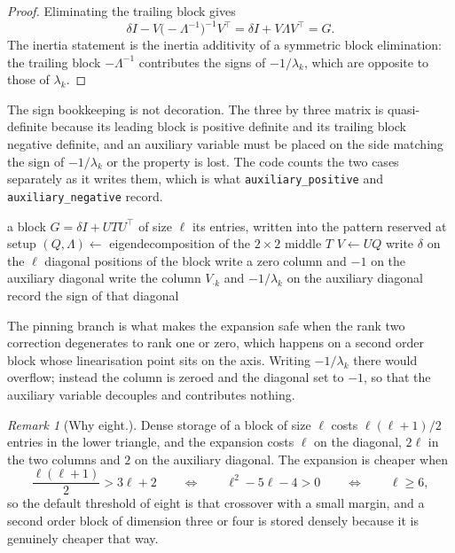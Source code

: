 \documentclass[a4paper,11pt]{book}
\theoremstyle{plain}
\theoremstyle{definition}
\theoremstyle{remark}
\newtheorem{remark}[theorem]{Remark}
\numberwithin{equation}{chapter}
\numberwithin{algorithm}{chapter}
\begin{document}
	\begin{proof}
		Eliminating the trailing block gives
		\[
		\delta I-V\bigl(-\Lambda^{-1}\bigr)^{-1}V^{\top}
		=\delta I+V\Lambda V^{\top}=G .
		\]
		The inertia statement is the inertia additivity of a symmetric block
		elimination: the trailing block $-\Lambda^{-1}$ contributes the signs of
		$-1/\lambda_k$, which are opposite to those of $\lambda_k$.
	\end{proof}

	The sign bookkeeping is not decoration. The three by three matrix is
	quasi-definite because its leading block is positive definite and its trailing
	block negative definite, and an auxiliary variable must be placed on the side
	matching the sign of $-1/\lambda_k$ or the property is lost. The code counts
	the two cases separately as it writes them, which is what
	\texttt{auxiliary\_positive} and \texttt{auxiliary\_negative} record.

	\begin{algorithm}[H]
		\caption{\texttt{write\_expanded}, one block}
		\begin{algorithmic}[1]
			\Require a block $G=\delta I+UTU^{\top}$ of size $\ell$
			\Ensure its entries, written into the pattern reserved at setup
			\State $(Q,\Lambda)\gets$ eigendecomposition of the $2\times2$ middle
			$T$
			\State $V\gets UQ$
			\State write $\delta$ on the $\ell$ diagonal positions of the block
			\State write a zero column and $-1$ on the auxiliary diagonal
			\Else
			\State write the column $V_{\cdot k}$ and $-1/\lambda_k$ on the
			auxiliary diagonal
			\EndIf
			\State record the sign of that diagonal
			\EndFor
		\end{algorithmic}
	\end{algorithm}

	The pinning branch is what makes the expansion safe when the rank two
	correction degenerates to rank one or zero, which happens on a second order
	block whose linearisation point sits on the axis. Writing $-1/\lambda_k$ there
	would overflow; instead the column is zeroed and the diagonal set to $-1$, so
	that the auxiliary variable decouples and contributes nothing.

	\begin{remark}[Why eight.]
	Dense storage of a block of size $\ell$ costs $\ell(\ell+1)/2$ entries in the
	lower triangle, and the expansion costs $\ell$ on the diagonal, $2\ell$ in the
	two columns and $2$ on the auxiliary diagonal. The expansion is cheaper when
	\[
	\frac{\ell(\ell+1)}{2}>3\ell+2
	\qquad\Longleftrightarrow\qquad
	\ell^2-5\ell-4>0
	\qquad\Longleftrightarrow\qquad
	\ell\geq6 ,
	\]
	so the default threshold of eight is that crossover with a small margin, and a
	second order block of dimension three or four is stored densely because it is
	genuinely cheaper that way.
\end{remark}
\end{document}
